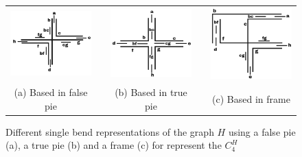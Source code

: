 \begin{figure}[htb]
  \centering
  \begin{tabular}{c c c c c }
    \includegraphics[width=4cm]{./img/falsePie.png}  %
    & &\includegraphics[width=4cm]{./img/truePie.png} %
    & &
 \includegraphics[width=4cm]{./img/frame.png} \\%
    {\footnotesize (a) Based in false pie}  & &  {\footnotesize(b) Based in true pie} & & {\footnotesize (c) Based in frame} %
  \end{tabular}
  \caption{Different single bend representations of the  graph $H$ using a false pie (a), a true pie (b) and a frame (c) for represent the $C_4^{H}$}\label{fig:falsepietruepieframe}
\end{figure} 